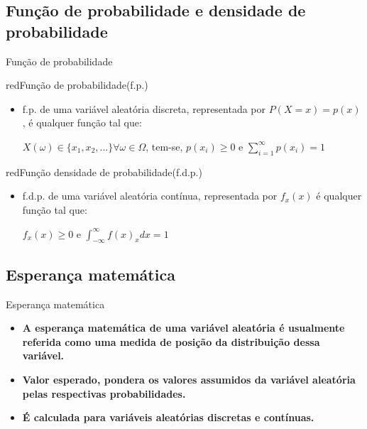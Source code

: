 \documentclass[9pt]{beamer}
\begin{document}
\subsection{Função de probabilidade e densidade de probabilidade}
\begin{frame}{Função de probabilidade}{}

\begin{block}{red}{Função de probabilidade(f.p.)}{}
\begin{itemize}
\item f.p. de uma variável aleatória discreta, representada por $P(X=x) =
p(x)$, é qualquer função tal que:

$X(\omega) \in \{x_1, x_2, ...\}\forall \omega \in \Omega$, tem-se, $p(x_i) \geq 0$ e $\displaystyle{
\sum_{i=1}^\infty p(x_i) = 1}$


\end{itemize}
\end{block}


\begin{block}{red}{Função densidade de probabilidade(f.d.p.)}{}
\begin{itemize}
\item f.d.p. de uma variável aleatória contínua, representada por
  $f_x(x)$
é qualquer função tal que:

$f_x(x) \geq 0$ e $\displaystyle{\int_{-\infty}^{\infty} f(x)_xdx = 1}$


\end{itemize}
\end{block}
\end{frame}


\subsection{Esperança matemática}
\begin{frame}{Esperança matemática}{}
\begin{itemize}
\item \textbf{A esperança matemática de uma variável aleatória é usualmente
referida como uma medida de posição da distribuição dessa variável.}
\item \textbf{Valor esperado, pondera os valores assumidos da variável aleatória
  pelas respectivas probabilidades.}
\item \textbf{É calculada para variáveis aleatórias discretas e contínuas.}
\end{itemize}

\end{frame}
\end{document}
